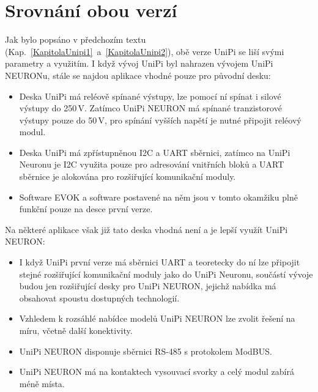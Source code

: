 

 
 



\section{Srovnání obou verzí}

Jak bylo popsáno v předchozím textu (Kap.~\ref{KapitolaUnipi1}~a~\ref{KapitolaUnipi2}), obě verze UniPi se liší svými parametry a využitím. I když vývoj UniPi byl nahrazen vývojem UniPi NEURONu, stále se najdou aplikace vhodné pouze pro původní desku:


\begin{itemize}
	\item Deska UniPi má reléově spínané výstupy, lze pomocí ní spínat i silové výstupy do 250\,V. Zatímco UniPi NEURON má spínané tranzistorové výstupy pouze do 50\,V, pro spínání vyšších napětí je nutné připojit reléový modul.
	\item Deska UniPi má zpřístupněnou I2C a UART sběrnici, zatímco na UniPi Neuronu je I2C využita pouze pro adresování vnitřních bloků a UART sběrnice je alokována pro rozšiřující komunikační moduly.
	\item Software EVOK a software postavené na něm jsou v tomto okamžiku plně funkční pouze na desce první verze.	
\end{itemize}

Na některé aplikace však již tato deska vhodná není a je lepší využít UniPi NEURON:

\begin{itemize}
	\item I když UniPi první verze má sběrnici UART a teoretecky do ní lze připojit stejné rozšiřující komunikační moduly jako do UniPi Neuronu, součástí vývoje budou jen rozšiřující desky pro UniPi NEURON, jejichž nabídka má obsahovat spoustu dostupných technologií.
	\item Vzhledem k rozsáhlé nabídce modelů UniPi NEURON lze zvolit řešení na míru, včetně další konektivity.
	\item UniPi NEURON disponuje sběrnici RS-485 s protokolem ModBUS.
	\item UniPi NEURON má na kontaktech vysouvací svorky a celý modul zabírá méně místa.	
\end{itemize}

